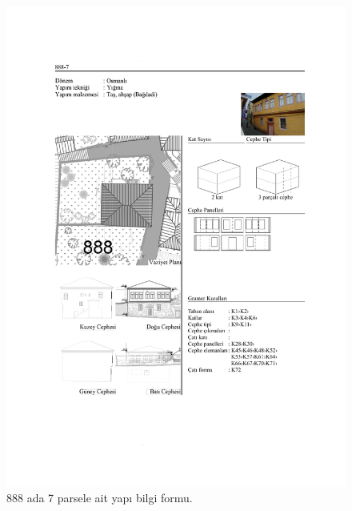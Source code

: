 \begin{figure}
\centering
\includegraphics[width=1\textwidth,height=\textheight]{source/figures/BilgiFormlari/888-7.pdf}
\caption{888 ada 7 parsele ait yapı bilgi formu.}
\end{figure}


